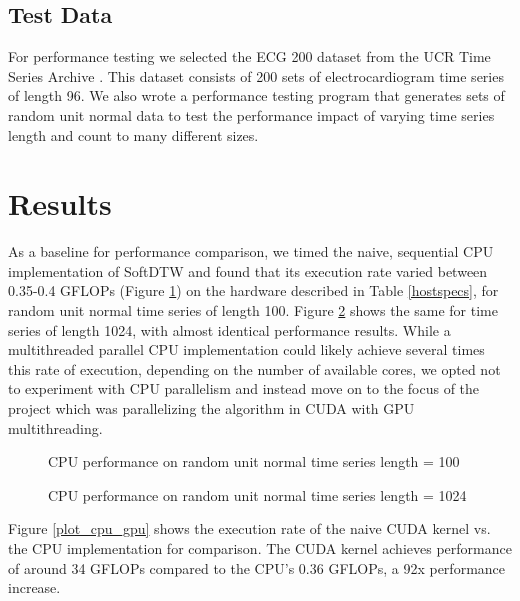\documentclass[12pt, letterpaper]{article}
\begin{document}
\subsection{Test Data}

For performance testing we selected the ECG 200 dataset from the UCR Time Series
Archive \cite{dau_ucr_2019}. This dataset consists of 200 sets of
electrocardiogram time series of length 96. We also wrote a performance testing
program that generates sets of random unit normal data to test the performance
impact of varying time series length and count to many different sizes.


\section{Results}
\FloatBarrier

As a baseline for performance comparison, we timed the naive, sequential CPU
implementation of SoftDTW and found that its execution rate varied between
0.35-0.4 GFLOPs (Figure \ref{plot_cpu}) on the hardware described in Table
\ref{hostspecs}, for random unit normal time series of length 100. Figure
\ref{plot_cpu_1024} shows the same for time series of length 1024, with almost
identical performance results. While a multithreaded parallel CPU implementation
could likely achieve several times this rate of execution, depending on the
number of available cores, we opted not to experiment with CPU parallelism and
instead move on to the focus of the project which was parallelizing the
algorithm in CUDA with GPU multithreading.

\begin{figure}[htbp]
    \begin{center}
        \scalebox{0.85}{}
    \end{center}
    \caption{CPU performance on random unit normal time series length = 100}
    \label{plot_cpu}
\end{figure}

\begin{figure}[htbp]
    \begin{center}
        \scalebox{0.85}{}
    \end{center}
    \caption{CPU performance on random unit normal time series length = 1024}
    \label{plot_cpu_1024}
\end{figure}


Figure \ref{plot_cpu_gpu} shows the execution rate of the naive CUDA kernel
vs. the CPU implementation for comparison. The CUDA kernel achieves performance
of around 34 GFLOPs compared to the CPU's 0.36 GFLOPs, a 92x performance
increase.
\end{document}
